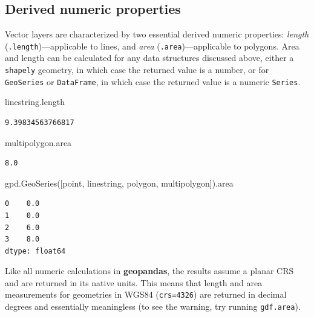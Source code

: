 \documentclass[
  letterpaper,
]{krantz}
\newenvironment{Shaded}{\begin{snugshade}}{\end{snugshade}}
\newcommand{\NormalTok}[1]{\textcolor[rgb]{0.00,0.23,0.31}{#1}}
\begin{document}
\subsection{Derived numeric properties}\label{sec-area-length}

Vector layers are characterized by two essential derived numeric
properties: \emph{length} (\texttt{.length})---applicable to lines, and
\emph{area} (\texttt{.area})---applicable to polygons. Area and length
can be calculated for any data structures discussed above, either a
\texttt{shapely} geometry, in which case the returned value is a number,
or for \texttt{GeoSeries} or \texttt{DataFrame}, in which case the
returned value is a numeric \texttt{Series}.

\begin{Shaded}
\begin{Highlighting}[]
\NormalTok{linestring.length}
\end{Highlighting}
\end{Shaded}

\begin{verbatim}
9.39834563766817
\end{verbatim}

\begin{Shaded}
\begin{Highlighting}[]
\NormalTok{multipolygon.area}
\end{Highlighting}
\end{Shaded}

\begin{verbatim}
8.0
\end{verbatim}

\begin{Shaded}
\begin{Highlighting}[]
\NormalTok{gpd.GeoSeries([point, linestring, polygon, multipolygon]).area}
\end{Highlighting}
\end{Shaded}

\begin{verbatim}
0    0.0
1    0.0
2    6.0
3    8.0
dtype: float64
\end{verbatim}

Like all numeric calculations in \textbf{geopandas}, the results assume
a planar CRS and are returned in its native units. This means that
length and area measurements for geometries in WGS84 (\texttt{crs=4326})
are returned in decimal degrees and essentially meaningless (to see the
warning, try running \texttt{gdf.area}).
\end{document}
